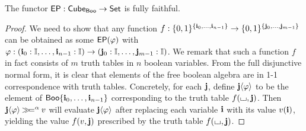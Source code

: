 \documentclass[a4paper]{article}
\begin{document}
\begin{proposition}
	The functor $\mathsf{EP} : {\mathsf{Cube}}_{\mathsf{Boo}} \to {\mathsf{Set}}$ is fully faithful.
\end{proposition}
\begin{proof}
	We need to show that any function $f : \mathopen{}\left\{ 0, 1 \right\}\mathclose{}^{\mathopen{}\left\{ \mathbf{i}_0, \ldots, \mathbf{i}_{n-1} \right\}\mathclose{}} \to \mathopen{}\left\{ 0, 1 \right\}\mathclose{}^{\mathopen{}\left\{ \mathbf{j}_0, \ldots, \mathbf{j}_{m-1} \right\}\mathclose{}}$
	can be obtained as some $\mathsf{EP}(\varphi)$ with $\varphi : (\mathbf{i}_0 : {\mathbb I}, \ldots, \mathbf{i}_{n-1} : {\mathbb I}) \to (\mathbf{j}_0 : {\mathbb I}, \ldots, \mathbf{j}_{m-1} : {\mathbb I})$.
	We remark that such a function $f$ in fact consists of $m$ truth tables in $n$ boolean variables.
	From the full disjunctive normal form, it is clear that elements of the free boolean algebra are in 1-1 correspondence with truth tables.
	Concretely, for each $\mathbf{j}$, define $\mathbf{j} \langle \varphi \rangle$ to be the element of $\mathsf{Boo} \mathopen{}\left\{ \mathbf{i}_0, \ldots, \mathbf{i}_{n-1} \right\}\mathclose{}$ corresponding to the truth table $f({\llcorner\hspace{-.4ex}\lrcorner}, \mathbf{j})$.
	Then $\mathbf{j} \langle \varphi \rangle \mathbin{\gg\hspace{-.5ex}=}^\alpha v$ will evaluate $\mathbf{j} \langle \varphi \rangle$ after replacing each variable $\mathbf{i}$ with its value $v(\mathbf{i})$, yielding the value $f(v, \mathbf{j})$ prescribed by the truth table $f({\llcorner\hspace{-.4ex}\lrcorner}, \mathbf{j})$.
\end{proof}
\end{document}
